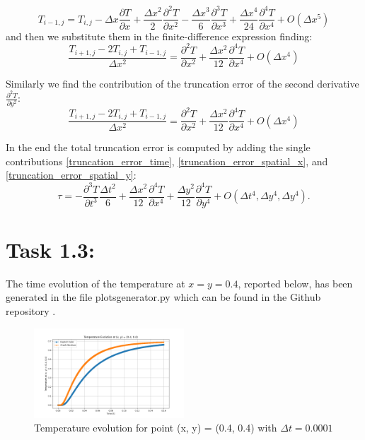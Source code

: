 \documentclass{article}
\begin{document}
\begin{equation}
  T_{i-1,j} = T_{i,j} - \Delta x \frac{\partial T}{\partial x} + \frac{\Delta x^2}{2} \frac{\partial^2 T}{\partial x^2} - \frac{\Delta x^3}{6} \frac{\partial^3 T}{\partial x^3} + \frac{\Delta x^4}{24} \frac{\partial^4 T}{\partial x^4} + O(\Delta x^5)
\end{equation}
and then we substitute them in the finite-difference expression finding:
\begin{equation} 
  \frac{T_{i+1,j} - 2T_{i,j} + T_{i-1,j}}{\Delta x^2} = \frac{\partial^2 T}{\partial x^2} + \frac{\Delta x^2}{12} \frac{\partial^4 T}{\partial x^4} + O(\Delta x^4) \label{truncation_error_spatial_x}
\end{equation}

Similarly we find the contribution of the truncation error of the second derivative $\frac{\partial^2 T}{\partial y^2}$:
\begin{equation} 
  \frac{T_{i+1,j} - 2T_{i,j} + T_{i-1,j}}{\Delta x^2} = \frac{\partial^2 T}{\partial x^2} + \frac{\Delta x^2}{12} \frac{\partial^4 T}{\partial x^4} + O(\Delta x^4) \label{truncation_error_spatial_y}
\end{equation}

In the end the total truncation error is computed by adding the single contributions \eqref{truncation_error_time}, \eqref{truncation_error_spatial_x}, and \eqref{truncation_error_spatial_y}:
\begin{equation}
  \tau = -\frac{\partial^3 T}{\partial t^3} \frac{\Delta t^2}{6} + \frac{\Delta x^2}{12} \frac{\partial^4 T}{\partial x^4} + \frac{\Delta y^2}{12} \frac{\partial^4 T}{\partial y^4} + O(\Delta t^4, \Delta y^4, \Delta y^4).
\end{equation}


\section*{\Large Task 1.3:}
The time evolution of the temperature at $ x =  y  = 0.4$, reported below, has been generated in the file plotsgenerator.py which can be found in the Github repository \cite{GitHubRepo}.

\begin{figure}[h]
\centering
\includegraphics[width=0.5\textwidth]{temperature_evolution_of_a_point_0-0001.png}
\caption{Temperature evolution for point (x, y) = (0.4, 0.4) with $\Delta t = 0.0001$}
\label{fig: point evolution}
\end{figure}
\end{document}
